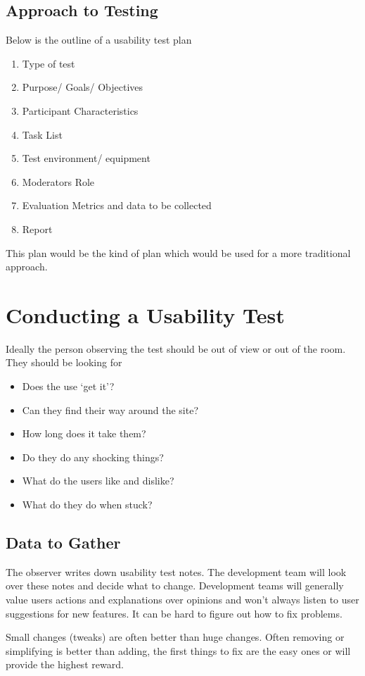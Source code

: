 \subsection{Approach to Testing}
Below is the outline of a usability test plan
\begin{enumerate}
    \item Type of test
    \item Purpose/ Goals/ Objectives
    \item Participant Characteristics
    \item Task List
    \item Test environment/ equipment
    \item Moderators Role
    \item Evaluation Metrics and data to be collected
    \item Report
\end{enumerate}
This plan would be the kind of plan which would be used for a more traditional approach.

\section{Conducting a Usability Test}
Ideally the person observing the test should be out of view or out of the room. They should be looking for
\begin{itemize}
    \item Does the use `get it'?
    \item Can they find their way around the site?
    \item How long does it take them?
    \item Do they do any shocking things?
    \item What do the users like and dislike?
    \item What do they do when stuck?
\end{itemize}

\subsection{Data to Gather}
The observer writes down usability test notes. The development team will look over these notes and decide what to change. Development teams will generally value users actions and explanations over opinions and won't always listen to user suggestions for new features. It can be hard to figure out how to fix problems. 

Small changes (tweaks) are often better than huge changes. Often removing or simplifying is better than adding, the first things to fix are the easy ones or will provide the highest reward. 


